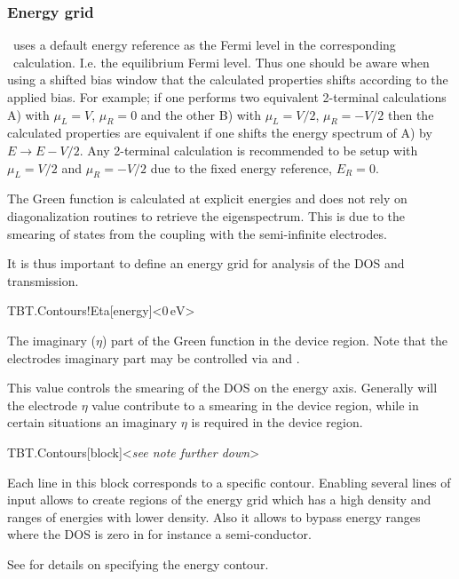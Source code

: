 \subsubsection{Energy grid}

\tbtrans\ uses a default energy reference as the Fermi level in the
corresponding \tsiesta\ calculation. I.e. the equilibrium Fermi
level. Thus one should be aware when using a shifted bias window that
the calculated properties shifts according to the applied bias. For
example; if one performs two equivalent 2-terminal calculations A)
with $\mu_L=V$, $\mu_R=0$ and the other B) with $\mu_L=V/2$,
$\mu_R=-V/2$ then the calculated properties are equivalent if one
shifts the energy spectrum of A) by $E \to E - V/2$. Any 2-terminal
calculation is recommended to be setup with $\mu_L=V/2$ and
$\mu_R=-V/2$ due to the fixed energy reference, $E_R = 0$.

The Green function is calculated at explicit energies and does not
rely on diagonalization routines to retrieve the eigenspectrum. This
is due to the smearing of states from the coupling with the
semi-infinite electrodes.

It is thus important to define an energy grid for analysis of the DOS
and transmission.

\begin{fdfentry}{TBT.Contours!Eta}[energy]<$0\,\mathrm{eV}$>
  
  The imaginary ($\eta$) part of the Green function in the device
  region. Note that the electrodes imaginary part may be controlled
  via  and .

  This value controls the smearing of the DOS on the energy
  axis. Generally will the electrode $\eta$ value contribute to a
  smearing in the device region, while in certain situations an
  imaginary $\eta$ is required in the device region. 
  
\end{fdfentry}

\begin{fdfentry}{TBT.Contours}[block]<\emph{see note further down}>

  Each line in this block corresponds to a specific contour.
  Enabling several lines of input allows to create regions of the
  energy grid which has a high density and ranges of energies with
  lower density. Also it allows to bypass energy ranges where the DOS
  is zero in for instance a semi-conductor.  

  See  for details on specifying the energy contour.
  
\end{fdfentry}

